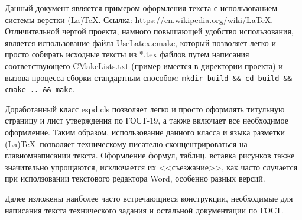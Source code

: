 \annotation

Данный документ является примером оформления текста с использованием системы верстки (La)\TeX. Ссылка: \url{https://en.wikipedia.org/wiki/LaTeX}. Отличительной чертой проекта, намного повышающей удобство использования, является использование файла UseLatex.cmake, который позволяет легко и просто собирать исходные тексты из *.tex файлов путем написания соответствующего CMakeLists.txt (пример имеется в директории проекта) и вызова процесса сборки стандартным способом: \lstinline|mkdir build && cd build && cmake .. && make|.

Доработанный класс espd.cls позволяет легко и просто оформлять титульную страницу и лист утверждения по ГОСТ-19, а также включает все необходимое оформление. Таким образом, использование данного класса и языка разметки (La)\TeX~позволяет техническому писателю сконцентрироваться на главном\mdash написании текста. Оформление формул, таблиц, вставка рисунков также значительно упрощаются, исключается их <<съезжание>>, как часто случается при исползовании текстового редактора Word, особенно разных версий.

Далее изложены наиболее часто встречающиеся конструкции, необходимые для написания текста технического задания и остальной документации по ГОСТ.

%
%
%
